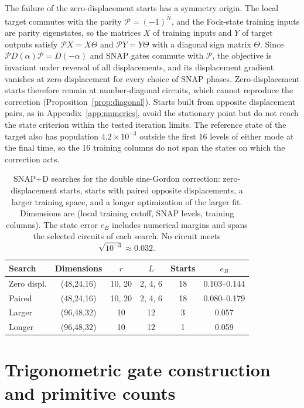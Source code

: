 \documentclass[pra,twocolumn,superscriptaddress,nofootinbib,floatfix]{revtex4-2}
\theoremstyle{remark}
\begin{document}
The failure of the zero-displacement starts has a symmetry origin. The local target commutes with the parity \(\mathcal P=(-1)^{\hat N}\), and the Fock-state training inputs are parity eigenstates, so the matrices \(X\) of training inputs and \(Y\) of target outputs satisfy \(\mathcal PX=X\Theta\) and \(\mathcal PY=Y\Theta\) with a diagonal sign matrix \(\Theta\). Since \(\mathcal PD(\alpha)\mathcal P=D(-\alpha)\) and SNAP gates commute with \(\mathcal P\), the objective is invariant under reversal of all displacements, and its displacement gradient vanishes at zero displacement for every choice of SNAP phases. Zero-displacement starts therefore remain at number-diagonal circuits, which cannot reproduce the correction (Proposition~\ref{prop:diagonal}). Starts built from opposite displacement pairs, as in Appendix~\ref{app:numerics}, avoid the stationary point but do not reach the state criterion within the tested iteration limits. The reference state of the target also has population \(4.2\times10^{-3}\) outside the first 16 levels of either mode at the final time, so the 16 training columns do not span the states on which the correction acts.

\begin{table}[t]
\caption{SNAP+D searches for the double sine-Gordon correction: zero-displacement starts, starts with paired opposite displacements, a larger training space, and a longer optimization of the larger fit. Dimensions are (local training cutoff, SNAP levels, training columns). The state error \(e_B\) includes numerical margins and spans the selected circuits of each search. No circuit meets \(\sqrt{10^{-3}}\approx0.032\).}
\label{tab:dsg-snap}
\begin{ruledtabular}
\begin{tabular}{lccccc}
Search & Dimensions & \(r\) & \(L\) & Starts & \(e_B\) \\
\hline
Zero displ. & (48,24,16) & 10, 20 & 2, 4, 6 & 18 & 0.103--0.144 \\
Paired & (48,24,16) & 10, 20 & 2, 4, 6 & 18 & 0.080--0.179 \\
Larger & (96,48,32) & 10 & 12 & 3 & 0.057 \\
Longer & (96,48,32) & 10 & 12 & 1 & 0.059 \\
\end{tabular}
\end{ruledtabular}
\end{table}

\section{Trigonometric gate construction and primitive counts}
\label{app:trig}
\end{document}
